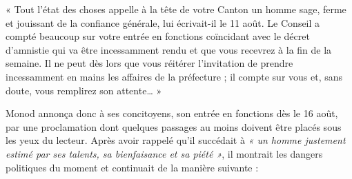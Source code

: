 \documentclass[french,twoside]{book} %
\newenvironment{quoteblock}%
  {\begin{quoting}}
  {\end{quoting}}
\newenvironment{quotebar}{%
    \def\FrameCommand{{\color{rubric!10!}\vrule width 0.5em} \hspace{0.9em}}%
    \def\OuterFrameSep{\itemsep} %
    \MakeFramed {\advance\hsize-\width \FrameRestore}
  }%
  {%
    \endMakeFramed
  }
\renewenvironment{quoteblock}%
  {%
    \savenotes
    \setstretch{0.9}
    \begin{quotebar}
  }
  {%
    \end{quotebar}
    \spewnotes
  }
\begin{document}
\begin{quoteblock}
 \noindent  « Tout l’état des choses appelle à la tête de votre Canton un homme sage, ferme et jouissant de la confiance générale, lui écrivait-il le 11 août. Le Conseil a compté beaucoup sur votre entrée en fonctions coïncidant avec le décret d’amnistie qui va être incessamment rendu et que vous recevrez à la fin de la semaine. Il ne peut dès lors que vous réitérer l’invitation de prendre incessamment en mains les affaires de la préfecture ; il compte sur vous et, sans doute, vous remplirez son attente… »
 \end{quoteblock}

\noindent Monod annonça donc à ses concitoyens, son entrée en fonctions dès le 16 août, par une proclamation dont quelques passages au moins doivent être placés sous les yeux du lecteur. Après avoir rappelé qu’il succédait à \emph{« un homme justement estimé par ses talents, sa bienfaisance et sa piété »}, il montrait les dangers politiques du moment et continuait de la manière suivante :\par
\end{document}
